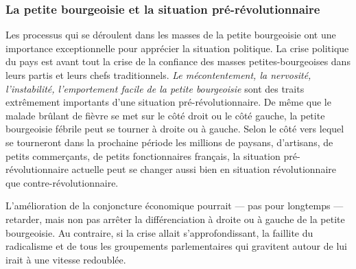 \documentclass[french,twoside]{book} %
\begin{document}
 \subsubsection[{La petite bourgeoisie et la situation pré-révolutionnaire}]{La petite bourgeoisie et la situation pré-révolutionnaire}
\noindent Les processus qui se déroulent dans les masses de la petite bourgeoisie ont une importance exceptionnelle pour apprécier la situation politique. La crise politique du pays est avant tout la crise de la confiance des masses petites-bourgeoises dans leurs partis et leurs chefs traditionnels. \emph{Le mécontentement, la nervosité, l’instabilité, l’emportement facile de la petite bourgeoisie} sont des traits extrêmement importants d’une situation pré-révolutionnaire. De même que le malade brûlant de fièvre se met sur le côté droit ou le côté gauche, la petite bourgeoisie fébrile peut se tourner à droite ou à gauche. Selon le côté vers lequel se tourneront dans la prochaine période les millions de paysans, d’artisans, de petits commerçants, de petits fonctionnaires français, la situation pré-révolutionnaire actuelle peut se changer aussi bien en situation révolutionnaire que contre-révolutionnaire.\par
L’amélioration de la conjoncture économique pourrait — pas pour longtemps — retarder, mais non pas arrêter la différenciation à droite ou à gauche de la petite bourgeoisie. Au contraire, si la crise allait s’approfondissant, la faillite du radicalisme et de tous les groupements parlementaires qui gravitent autour de lui irait à une vitesse redoublée.
\end{document}

